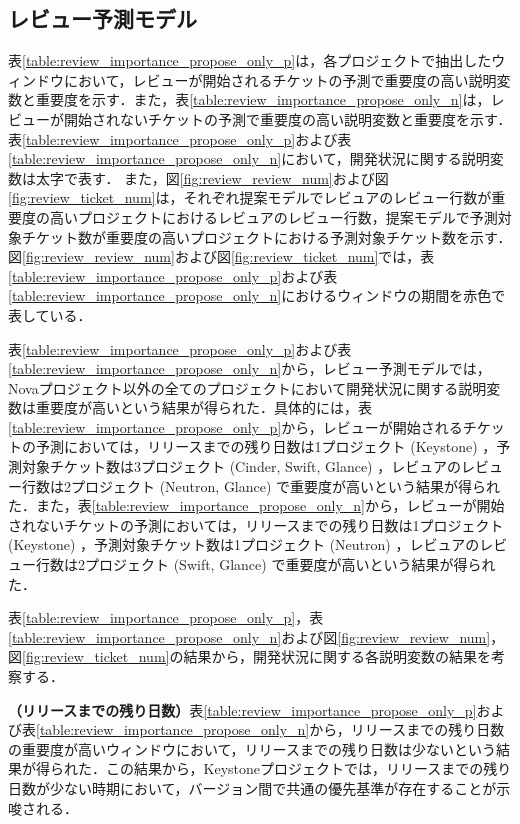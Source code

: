 \documentclass[11pt]{jreport}
\begin{document}
\subsection{レビュー予測モデル}\label{sec:rq2_kousatu_review}
表\ref{table:review_importance_propose_only_p}は，各プロジェクトで抽出したウィンドウにおいて，レビューが開始されるチケットの予測で重要度の高い説明変数と重要度を示す．また，表\ref{table:review_importance_propose_only_n}は，レビューが開始されないチケットの予測で重要度の高い説明変数と重要度を示す．表\ref{table:review_importance_propose_only_p}および表\ref{table:review_importance_propose_only_n}において，開発状況に関する説明変数は太字で表す．
また，図\ref{fig:review_review_num}および図\ref{fig:review_ticket_num}は，それぞれ提案モデルでレビュアのレビュー行数が重要度の高いプロジェクトにおけるレビュアのレビュー行数，提案モデルで予測対象チケット数が重要度の高いプロジェクトにおける予測対象チケット数を示す．図\ref{fig:review_review_num}および図\ref{fig:review_ticket_num}では，表\ref{table:review_importance_propose_only_p}および表\ref{table:review_importance_propose_only_n}におけるウィンドウの期間を赤色で表している．

表\ref{table:review_importance_propose_only_p}および表\ref{table:review_importance_propose_only_n}から，レビュー予測モデルでは，Novaプロジェクト以外の全てのプロジェクトにおいて開発状況に関する説明変数は重要度が高いという結果が得られた．具体的には，表\ref{table:review_importance_propose_only_p}から，レビューが開始されるチケットの予測においては，リリースまでの残り日数は1プロジェクト (Keystone) ，予測対象チケット数は3プロジェクト (Cinder, Swift, Glance) ，レビュアのレビュー行数は2プロジェクト (Neutron, Glance) で重要度が高いという結果が得られた．また，表\ref{table:review_importance_propose_only_n}から，レビューが開始されないチケットの予測においては，リリースまでの残り日数は1プロジェクト (Keystone) ，予測対象チケット数は1プロジェクト (Neutron) ，レビュアのレビュー行数は2プロジェクト (Swift, Glance) で重要度が高いという結果が得られた．

表\ref{table:review_importance_propose_only_p}，表\ref{table:review_importance_propose_only_n}および図\ref{fig:review_review_num}，図\ref{fig:review_ticket_num}の結果から，開発状況に関する各説明変数の結果を考察する．

\textbf{（リリースまでの残り日数）}表\ref{table:review_importance_propose_only_p}および表\ref{table:review_importance_propose_only_n}から，リリースまでの残り日数の重要度が高いウィンドウにおいて，リリースまでの残り日数は少ないという結果が得られた．この結果から，Keystoneプロジェクトでは，リリースまでの残り日数が少ない時期において，バージョン間で共通の優先基準が存在することが示唆される．
\end{document}
